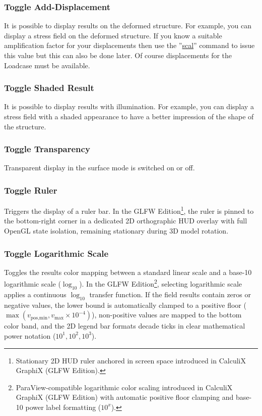 \documentclass{article}
\providecommand{\htmlref}[2]{\hyperref[#2]{#1}}
\begin{document}
\subsubsection{\label{Toggle Add-Displacement}Toggle Add-Displacement}
It is possible to display results on the deformed structure. For example, you can display a stress field on the deformed structure. If you know a suitable amplification factor for your displacements then use the ''\htmlref{scal}{scal}'' command to issue this value but this can also be done later. Of course displacements for the Loadcase must be available.

\subsubsection{\label{Toggle Shaded Result}Toggle Shaded Result}
It is possible to display results with illumination. For example, you can display a stress field with a shaded appearance to have a better impression of the shape of the structure.

\subsubsection{\label{Toggle Transparency}Toggle Transparency}
Transparent display in the surface mode is switched on or off.

\subsubsection{\label{Toggle Ruler}Toggle Ruler}
Triggers the display of a ruler bar. In the GLFW Edition\footnote{Stationary 2D HUD ruler anchored in screen space introduced in CalculiX GraphiX (GLFW Edition).}, the ruler is pinned to the bottom-right corner in a dedicated 2D orthographic HUD overlay with full OpenGL state isolation, remaining stationary during 3D model rotation.

\subsubsection{\label{Toggle Logarithmic Scale}Toggle Logarithmic Scale}
Toggles the results color mapping between a standard linear scale and a base-10 logarithmic scale ($\log_{10}$). In the GLFW Edition\footnote{ParaView-compatible logarithmic color scaling introduced in CalculiX GraphiX (GLFW Edition) with automatic positive floor clamping and base-10 power label formatting ($10^x$).}, selecting logarithmic scale applies a continuous $\log_{10}$ transfer function. If the field results contain zeros or negative values, the lower bound is automatically clamped to a positive floor ($\max(v_{\text{pos,min}}, v_{\max} \times 10^{-4})$), non-positive values are mapped to the bottom color band, and the 2D legend bar formats decade ticks in clear mathematical power notation ($10^1, 10^2, 10^3$).
\end{document}
